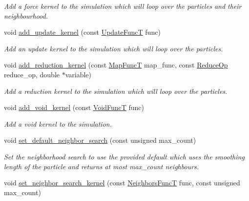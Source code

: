\begin{DoxyCompactItemize}
\begin{DoxyCompactList}\small\item\em Add a force kernel to the simulation which will loop over the particles and their neighbourhood. \end{DoxyCompactList}\item 
void \mbox{\hyperlink{namespacewash_abc27c958fb1156da77a1346c3559abc1}{add\+\_\+update\+\_\+kernel}} (const \mbox{\hyperlink{namespacewash_aaae2f0d4980b7c550d6de709b35f0b8e}{Update\+FuncT}} func)
\begin{DoxyCompactList}\small\item\em Add an update kernel to the simulation which will loop over the particles. \end{DoxyCompactList}\item 
void \mbox{\hyperlink{namespacewash_a730e8352e9361e6ef88fd4b4c21e7f8c}{add\+\_\+reduction\+\_\+kernel}} (const \mbox{\hyperlink{namespacewash_ad515914307c88c01ff7524c57feabf83}{Map\+FuncT}} map\+\_\+func, const \mbox{\hyperlink{namespacewash_a9c59e8c142d63d8640921c1b1957807e}{Reduce\+Op}} reduce\+\_\+op, double $\ast$variable)
\begin{DoxyCompactList}\small\item\em Add a reduction kernel to the simulation which will loop over the particles. \end{DoxyCompactList}\item 
void \mbox{\hyperlink{namespacewash_ab49fcc701f7afced2186465ba5cce978}{add\+\_\+void\+\_\+kernel}} (const \mbox{\hyperlink{namespacewash_a7de7a4195ce994df4dd54ff86e3fff20}{Void\+FuncT}} func)
\begin{DoxyCompactList}\small\item\em Add a void kernel to the simulation. \end{DoxyCompactList}\item 
void \mbox{\hyperlink{namespacewash_abc2e79908c969eabb61a865c8f279d02}{set\+\_\+default\+\_\+neighbor\+\_\+search}} (const unsigned max\+\_\+count)
\begin{DoxyCompactList}\small\item\em Set the neighborhood search to use the provided default which uses the smoothing length of the particle and returns at most max\+\_\+count neighbours. \end{DoxyCompactList}\item 
void \mbox{\hyperlink{namespacewash_a49d266f2bd4daa1a1de50dab5a4250df}{set\+\_\+neighbor\+\_\+search\+\_\+kernel}} (const \mbox{\hyperlink{namespacewash_a8135d763bfc59fce07b49873d8af0ed6}{Neighbors\+FuncT}} func, const unsigned max\+\_\+count)

\end{DoxyCompactItemize}
